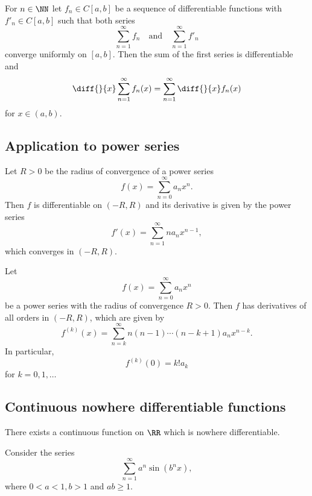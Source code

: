 \documentclass[12pt, a4paper]{article}
\begin{document}
\begin{corollary}
    For \(n\in \NN\) let \(f_n \in C[a,b]\) be a sequence of differentiable functions with \(f'_n \in C[a,b]\) such that both series 
    \[\sum_{n=1}^{\infty} f_n \quad \text{and} \quad \sum_{n=1}^{\infty} f'_n\]
    converge uniformly on \([a,b]\). Then the sum of the first series is differentiable and 
    \[\diff{}{x} \sum_{n=1}^{\infty} f_n(x)= \sum_{n=1}^{\infty} \diff{}{x} f_n(x)\]
    for \(x \in (a,b)\).
\end{corollary}

\subsection{Application to power series}

\begin{mdthm}
    Let \(R>0\) be the radius of convergence of a power series 
    \[f(x) = \sum_{n=0}^{\infty} a_n x^n.\]
    Then \(f\) is differentiable on \((-R,R)\) and its derivative is given by the power series 
    \[f'(x)=\sum_{n=1}^{\infty} n a_n x^{n-1},\]
    which converges in \((-R,R)\).
\end{mdthm}

\begin{corollary}
    Let
    \[f(x)=\sum_{n=0}^{\infty} a_n x^n\]
    be a power series with the radius of convergence \(R>0\). Then \(f\) has derivatives of all orders in \((-R,R)\), which are given by 
    \[f^{(k)} (x) = \sum_{n=k}^{\infty} n(n-1) \cdots (n-k+1) a_n x^{n-k}.\]
    In particular,
    \[f^{(k)}(0)=k! a_k\]
    for \(k = 0,1,\ldots\)
\end{corollary}

\subsection{Continuous nowhere differentiable functions}

\begin{mdthm}
    There exists a continuous function on \(\RR\) which is nowhere differentiable.
\end{mdthm}

\begin{mdexample}
    Consider the series 
    \[\sum_{n=1}^{\infty} a^n \sin(b^n x),\]
    where \(0<a<1,b>1\) and \(ab\geq 1\).
\end{mdexample}

\end{document}

